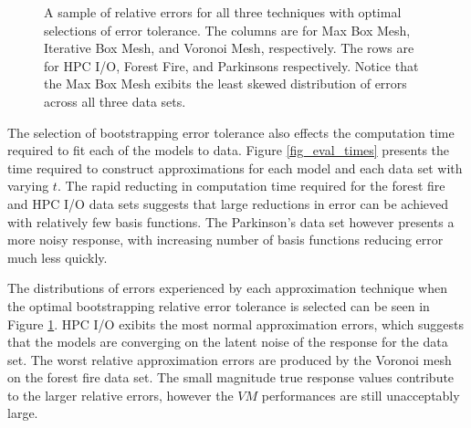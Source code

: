 \begin{figure}[htb]
  \caption{A sample of relative errors for all three techniques with optimal selections of error tolerance. The columns are for Max Box Mesh, Iterative Box Mesh, and Voronoi Mesh, respectively. The rows are for HPC I/O, Forest Fire, and Parkinsons respectively. Notice that the Max Box Mesh exibits the least skewed distribution of errors across all three data sets.
    \vspace{-.3cm}}
  \label{fig_perf_sample}
\end{figure}

The selection of bootstrapping error tolerance also effects the computation time required to fit each of the models to data. Figure \ref{fig_eval_times} presents the time required to construct approximations for each model and each data set with varying $t$. The rapid reducting in computation time required for the forest fire and HPC I/O data sets suggests that large reductions in error can be achieved with relatively few basis functions. The Parkinson's data set however presents a more noisy response, with increasing number of basis functions reducing error much less quickly.

The distributions of errors experienced by each approximation technique when the optimal bootstrapping relative error tolerance is selected can be seen in Figure \ref{fig_perf_sample}. HPC I/O exibits the most normal approximation errors, which suggests that the models are converging on the latent noise of the response for the data set. The worst relative approximation errors are produced by the Voronoi mesh on the forest fire data set. The small magnitude true response values contribute to the larger relative errors, however the $VM$ performances are still unacceptably large.

